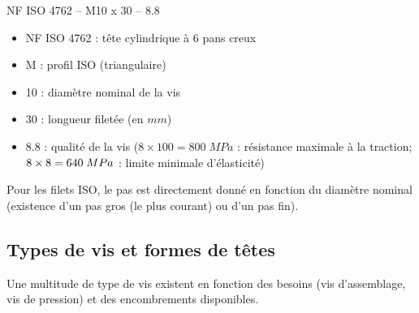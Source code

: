 \documentclass[11pt,oneside]{article}
\begin{document}
\noindent\noindent\begin{minipage}[c]{.46\linewidth}
\begin{center}
NF ISO 4762 -- M10 x 30 -- 8.8
\end{center}
\end{minipage}\hfill
\noindent\begin{minipage}[c]{.46\linewidth}
\begin{itemize}
\item NF ISO 4762 : tête cylindrique à 6 pans creux
\item M : profil ISO (triangulaire)
\item 10 : diamètre nominal de la vis 
\item 30 : longueur filetée (en $mm$)
\item 8.8 : qualité de la vis ($8\times 100=800\; MPa$ : résistance maximale à la traction; $8\times 8 \time 10 = 640 \; MPa$ : limite minimale d'élasticité)
\end{itemize}
\end{minipage}

\vspace{.25cm}
Pour les filets ISO, le pas est directement donné en fonction du diamètre nominal (existence d'un pas gros (le plus courant) ou d'un pas fin).

\subsection{Types de vis et formes de têtes}
Une multitude de type de vis existent en fonction des besoins (vis d'assemblage, vis de pression) et des encombrements disponibles.
\end{document}
